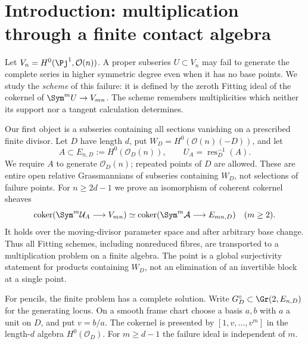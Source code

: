 \section{Introduction: multiplication through a finite contact algebra}
\label{sec:conductor-introduction}
Let $V_n=H^0(\Pj^1,\mathcal O(n))$. A proper subseries
$U\subset V_n$ may fail to generate the complete series in higher
symmetric degree even when it has no base points. We study the
\emph{scheme} of this failure: it is defined by the zeroth Fitting
ideal of the cokernel of $\Sym^m U\to V_{mn}$. The scheme remembers
multiplicities which neither its support nor a tangent calculation
determines.

Our first object is a subseries containing all sections vanishing on
a prescribed finite divisor. Let $D$ have length $d$, put
$W_D=H^0(\mathcal O(n)(-D))$, and let
\[
 A\subset E_{n,D}:=H^0(\mathcal O_D(n)),\qquad
 U_A=\operatorname{res}_D^{-1}(A).
\]
We require $A$ to generate $\mathcal O_D(n)$; repeated points of $D$
are allowed. These are entire open relative Grassmannians of
subseries containing $W_D$, not selections of failure points. For
$n\ge2d-1$ we prove an isomorphism of coherent cokernel sheaves
\begin{equation}\label{eq:intro-conductor-cokernel}
 \operatorname{coker}(\Sym^m\mathcal U_A\longrightarrow V_{mn})
 \simeq
 \operatorname{coker}(\Sym^m\mathcal A\longrightarrow E_{mn,D})
 \quad(m\ge2).
\end{equation}
It holds over the moving-divisor parameter space and after arbitrary
base change. Thus all Fitting schemes, including nonreduced fibres,
are transported to a multiplication problem on a finite algebra.
The point is a global surjectivity statement for products containing
$W_D$, not an elimination of an invertible block at a single point.

For pencils, the finite problem has a complete solution. Write
$G_D^\circ\subset\Gr(2,E_{n,D})$ for the generating locus. On a
smooth frame chart choose a basis $a,b$ with $a$ a unit on $D$,
and put $v=b/a$. The cokernel is presented by
$[1,v,\ldots,v^m]$ in the length-$d$ algebra $H^0(\mathcal O_D)$.
For $m\ge d-1$ the failure ideal is independent of $m$.

